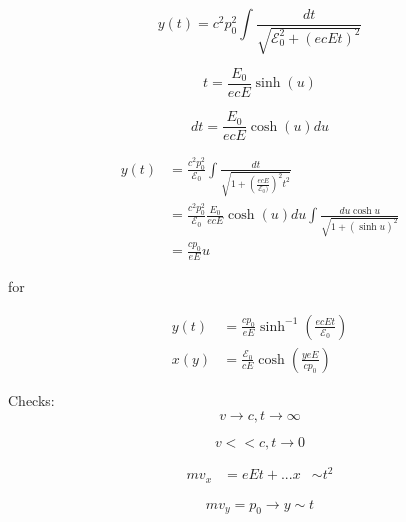 \begin{equation}\label{eqn:relativisticElectrodynamicsT3:340}
y(t) = c^2 p_0^2 \int \frac{dt}{ \sqrt{\mathcal{E}_0^2 + (e c E t)^2 }}
\end{equation}

\begin{equation}\label{eqn:relativisticElectrodynamicsT3:360}
t = \frac{E_0}{ e c E} \sinh(u) 
\end{equation}

\begin{equation}\label{eqn:relativisticElectrodynamicsT3:380}
dt = \frac{E_0}{ e c E} \cosh(u) du
\end{equation}

\begin{align*}
y(t) 
&= \frac{c^2 p_0^2}{\mathcal{E}_0} \int \frac{dt}{\sqrt{1 + (\frac{e c E}{\mathcal{E}_0)})^2 t^2 }} \\
&= \frac{c^2 p_0^2}{\mathcal{E}_0} 
\frac{E_0}{ e c E} \cosh(u) du
\int \frac{ du \cosh u }{\sqrt{1 + (\sinh u)^2 }} \\
&= \frac{c p_0}{ e E} u 
\end{align*}

for

\begin{equation}\label{eqn:relativisticElectrodynamicsT3:400}
\boxed{
\begin{aligned}
y(t) &= \frac{c p_0}{ e E} \sinh^{-1} \left( \frac{e c E t}{\mathcal{E}_0} \right) \\
x(y) &= \frac{\mathcal{E}_0}{c E} \cosh( \frac{y e E }{ c p_0} )
\end{aligned}
}
\end{equation}

Checks:
\begin{equation}\label{eqn:relativisticElectrodynamicsT3:420}
v \rightarrow c, t \rightarrow \infty
\end{equation}

\begin{equation}\label{eqn:relativisticElectrodynamicsT3:440}
v << c, t \rightarrow 0
\end{equation}

\begin{align*}
m v_x &= e E t + ...
x &\sim t^2 
\end{align*}

\begin{equation}\label{eqn:relativisticElectrodynamicsT3:460}
m v_y = p_0 \rightarrow y \sim t
\end{equation}

